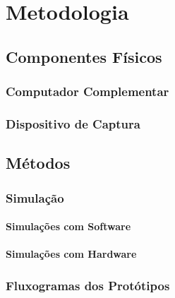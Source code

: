 \chapter{Metodologia}\label{cap:metodologia}

\lipsum[40]

\section{Componentes Físicos}

\lipsum[40]

\subsection{Computador Complementar}

\lipsum[40]

\subsection{Dispositivo de Captura}

\lipsum[40]

\section{Métodos}

\subsection{Simulação}

\lipsum[40]

\subsubsection{Simulações com Software}

\lipsum[40]

\subsubsection{Simulações com Hardware}

\lipsum[40]

\subsection{Fluxogramas dos Protótipos}

\lipsum[40]